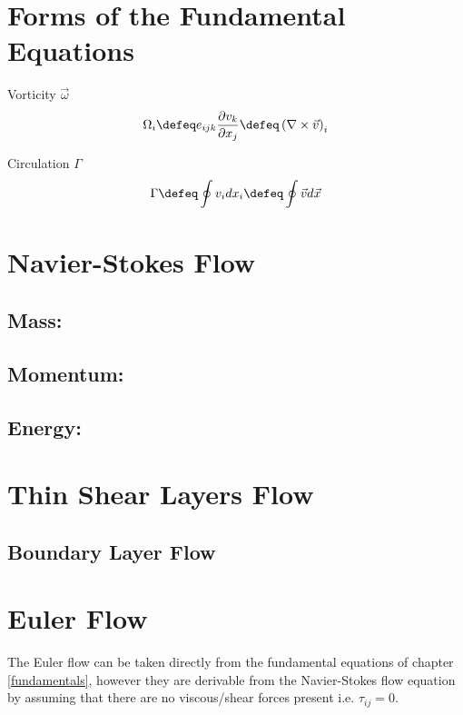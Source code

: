 \newpage
\section{Forms of the Fundamental Equations}
Vorticity $\vec{\omega}$
\begin{equation}
    \label{vorticity}
    \Omega_i \defeq e_{ijk}\frac{\partial v_k}{\partial x_j}  \defeq  \left( \nabla \times \vec{v} \right)_i 
\end{equation}

Circulation $\Gamma$
\begin{equation}
    \label{circulation}
    \Gamma \defeq \oint v_i dx_i  \defeq \oint \vec{v} d\vec{x}
\end{equation}



\newpage
\section{Navier-Stokes Flow}

\subsection*{Mass:}

\subsection*{Momentum:}

\subsection*{Energy:}







\newpage
\section{Thin Shear Layers Flow}

\subsection{Boundary Layer Flow}








\newpage
\section{Euler Flow}
The Euler flow can be taken directly from the fundamental equations of chapter \ref{fundamentals}, however they are derivable from the Navier-Stokes flow equation by assuming that there are no viscous/shear forces present i.e. $\tau_{ij}=0$.
